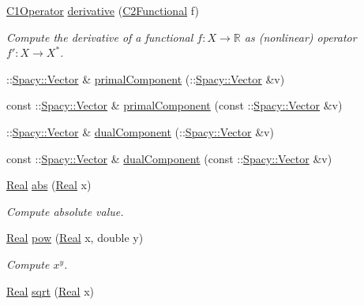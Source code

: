 \begin{DoxyCompactItemize}
\hyperlink{classSpacy_1_1C1Operator}{\-C1\-Operator} \hyperlink{namespaceSpacy_a002fe344fa6d04a6ac59a74ea25fddb6}{derivative} (\hyperlink{classSpacy_1_1C2Functional}{\-C2\-Functional} f)
\begin{DoxyCompactList}\small\item\em \-Compute the derivative of a functional $ f: X\to \mathbb{R} $ as (nonlinear) operator $ f':X\to X^* $. \end{DoxyCompactList}\item 
\-::\hyperlink{classSpacy_1_1Vector}{\-Spacy\-::\-Vector} \& \hyperlink{group__ProductSpaceGroup_gaa040ba5c24284687e0df19c99dd688a6}{primal\-Component} (\-::\hyperlink{classSpacy_1_1Vector}{\-Spacy\-::\-Vector} \&v)
\item 
const \-::\hyperlink{classSpacy_1_1Vector}{\-Spacy\-::\-Vector} \& \hyperlink{group__ProductSpaceGroup_ga88c5bcc74072f75c63ab7d9448f80a7e}{primal\-Component} (const \-::\hyperlink{classSpacy_1_1Vector}{\-Spacy\-::\-Vector} \&v)
\item 
\-::\hyperlink{classSpacy_1_1Vector}{\-Spacy\-::\-Vector} \& \hyperlink{group__ProductSpaceGroup_gafe51c084e3b03205db94e91309e834f7}{dual\-Component} (\-::\hyperlink{classSpacy_1_1Vector}{\-Spacy\-::\-Vector} \&v)
\item 
const \-::\hyperlink{classSpacy_1_1Vector}{\-Spacy\-::\-Vector} \& \hyperlink{group__ProductSpaceGroup_gabe5978657aab46b1575e2521b336407d}{dual\-Component} (const \-::\hyperlink{classSpacy_1_1Vector}{\-Spacy\-::\-Vector} \&v)
\item 
\hypertarget{namespaceSpacy_a89ed08f6f5a05e3f35afa37fcebf4b06}{\hyperlink{classSpacy_1_1Real}{\-Real} \hyperlink{namespaceSpacy_a89ed08f6f5a05e3f35afa37fcebf4b06}{abs} (\hyperlink{classSpacy_1_1Real}{\-Real} x)}\label{namespaceSpacy_a89ed08f6f5a05e3f35afa37fcebf4b06}

\begin{DoxyCompactList}\small\item\em \-Compute absolute value. \end{DoxyCompactList}\item 
\hypertarget{namespaceSpacy_acffef7eb409609abe7ad87aaad28503f}{\hyperlink{classSpacy_1_1Real}{\-Real} \hyperlink{namespaceSpacy_acffef7eb409609abe7ad87aaad28503f}{pow} (\hyperlink{classSpacy_1_1Real}{\-Real} x, double y)}\label{namespaceSpacy_acffef7eb409609abe7ad87aaad28503f}

\begin{DoxyCompactList}\small\item\em \-Compute $x^y$. \end{DoxyCompactList}\item 
\hypertarget{namespaceSpacy_aa779bb3e2bf547cd0ed9ef47b3d711a3}{\hyperlink{classSpacy_1_1Real}{\-Real} \hyperlink{namespaceSpacy_aa779bb3e2bf547cd0ed9ef47b3d711a3}{sqrt} (\hyperlink{classSpacy_1_1Real}{\-Real} x)}\label{namespaceSpacy_aa779bb3e2bf547cd0ed9ef47b3d711a3}


\end{DoxyCompactItemize}
